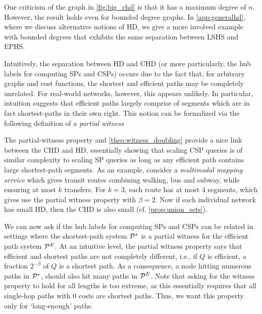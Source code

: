 \documentclass[opre,nonblindrev]{informs3} %
\begin{document}
\begin{remark}
One criticism of the graph in \cref{fig:big_chd} is that it has a maximum degree of $n$.
However, the result holds even for bounded degree graphs.
In \cref{app:generalhd}, where we discuss alternative notions of HD, we give a more involved example with bounded degrees that exhibits the same separation between LSHS and EPHS.
\end{remark}

Intuitively, the separation between HD and CHD (or more particularly, the hub labels for computing SPs and CSPs) occurs due to the fact that, for arbitrary graphs and cost functions, the shortest and efficient paths may be completely unrelated. 
For real-world networks, however, this appears unlikely.
In particular, intuition suggests that efficient paths largely comprise of segments which are in fact shortest-paths in their own right. 
This notion can be formalized via the following definition of a \emph{partial witness} 

The partial-witness property and \cref{theo:witness_doubling} provide a nice link between the CHD and HD, essentially showing that scaling CSP queries is of similar complexity to scaling SP queries as long as any efficient path contains large shortest-path segments. 
As an example, consider a \emph{multimodal mapping service} which gives transit routes combining walking, bus and subway, while ensuring at most $k$ transfers. 
For $k=3$, each route has at most $4$ segments, which gives use the partial witness property with $\beta = 2$. 
Now if each individual network has small HD, then the CHD is also small (cf. \cref{prop:union_sets}).

We can now ask if the hub labels for computing SPs and CSPs can be related in settings where the shortest-path system $\mathcal{P}^*$ is a partial witness for the efficient path system $\mathcal{P}^E$.
At an intuitive level, the partial witness property says that efficient and shortest paths are not completely different, i.e., if $Q$ is efficient, a fraction $2^{-\beta}$ of $Q$ is a shortest path.
As a consequence, a node hitting numerous paths in $\mathcal{P}^*$, should also hit many paths in $\mathcal{P}^E$.
Note that asking for the witness property to hold for all lengths is too extreme, as this essentially requires that all single-hop paths with 0 costs are shortest paths.
Thus, we want this property only for `long-enough' paths. 
\end{document}
